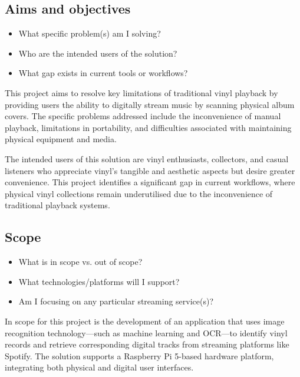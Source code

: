         \subsection{Aims and objectives}
        
            \begin{temp}
                \begin{itemize}
                    \item What specific problem(s) am I solving?
                    \item Who are the intended users of the solution?
                    \item What gap exists in current tools or workflows?
                \end{itemize}
            \end{temp}
    
            This project aims to resolve key limitations of traditional vinyl playback by providing users the ability to digitally stream music by scanning physical album covers. The specific problems addressed include the inconvenience of manual playback, limitations in portability, and difficulties associated with maintaining physical equipment and media.
    
            The intended users of this solution are vinyl enthusiasts, collectors, and casual listeners who appreciate vinyl's tangible and aesthetic aspects but desire greater convenience. This project identifies a significant gap in current workflows, where physical vinyl collections remain underutilised due to the inconvenience of traditional playback systems.
        
        \subsection{Scope}
    
            \begin{temp}
                \begin{itemize}
                    \item What is in scope vs. out of scope?
                    \item What technologies/platforms will I support?
                    \item Am I focusing on any particular streaming service(s)?
                \end{itemize}
            \end{temp}
    
            In scope for this project is the development of an application that uses image recognition technology—such as machine learning and OCR—to identify vinyl records and retrieve corresponding digital tracks from streaming platforms like Spotify. The solution supports a Raspberry Pi 5-based hardware platform, integrating both physical and digital user interfaces.
    

